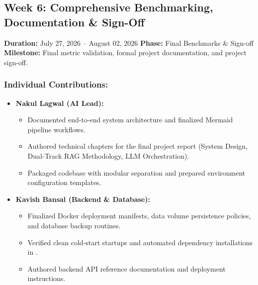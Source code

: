 \documentclass[11pt,a4paper]{article}
\begin{document}
\newpage
\subsection*{Week 6: Comprehensive Benchmarking, Documentation \& Sign-Off}
\noindent \textbf{Duration:} July 27, 2026 -- August 02, 2026 \hfill \textbf{Phase:} Final Benchmarks \& Sign-off \\
\textbf{Milestone:} Final metric validation, formal project documentation, and project sign-off.

\subsubsection*{Individual Contributions:}
\begin{itemize}
    \setlength{\itemsep}{1pt}
    \item \textbf{Nakul Lagwal (AI Lead):}
    \begin{itemize}
        \setlength{\itemsep}{0pt}
        \item Documented end-to-end system architecture and finalized Mermaid pipeline workflows.
        \item Authored technical chapters for the final project report (System Design, Dual-Track RAG Methodology, LLM Orchestration).
        \item Packaged codebase with modular separation and prepared environment configuration templates.
    \end{itemize}

    \item \textbf{Kavish Bansal (Backend \& Database):}
    \begin{itemize}
        \setlength{\itemsep}{0pt}
        \item Finalized Docker deployment manifests, data volume persistence policies, and database backup routines.
        \item Verified clean cold-start startups and automated dependency installations in .
        \item Authored backend API reference documentation and deployment instructions.
    \end{itemize}


\end{itemize}
\end{document}
